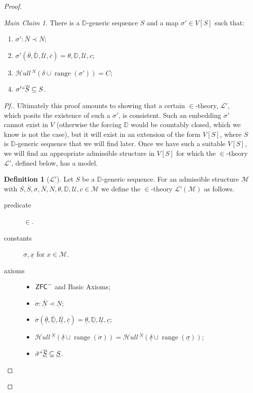 \documentclass{amsart}
\theoremstyle{definition}
\newtheorem{definition}[theorem]{Definition}
\theoremstyle{remark}
\newtheorem*{claim}{Main Claim}
\newcommand{\M}{\mathcal{M}}
\newcommand{\D}{\mathbb{D}}
\newcommand{\N}{{\overline{N}}}
\renewcommand{\S}{{\overline{S}}}
\newcommand{\U}{\mathcal{U}}
\newcommand{\ZFC}{\textup{\ensuremath{\textsf{ZFC}}}}
\DeclareMathOperator{\ran}{range}
\newcommand{\SH}{\mathcal{H}\textit{ull} \,}
\newcommand{\sk}[3]{\SH^{#1}( {#2} \cup {\ran(#3)} ) }
\begin{document}
\begin{proof}
\begin{claim} There is a $\D$-generic sequence $S$ and a map $\sigma' \in V[S]$ such that: \begin{enumerate}
	\item \label{item:mainclaimsigma'elem} $\sigma': \N \prec N$;
	\item \label{item:mainclaim2} $\sigma'(\overline \theta, \overline{\D}, \overline{\U}, \overline c)=\theta, \D, \U, c$;
	\item \label{item:MainClaimC=Sk} $\sk{N}{\delta}{\sigma'} = C$;
	\item \label{item:mainclaimlifts} $\sigma' `` \S \subseteq S$.
\end{enumerate} \end{claim}
\begin{proof}[Pf.]  Ultimately this proof amounts to showing that a certain 
$\in$-theory, $\mathcal L'$, which posits the existence of such a $\sigma'$, is consistent. Such an embedding $\sigma'$ cannot exist in $V$ (otherwise the forcing $\D$ would be countably closed, which we know is not the case), but it will exist in an extension of the form $V[S]$, where $S$ is $\D$-generic sequence that we will find later.
Once we have such a suitable $V[S]$, we will find an appropriate admissible structure in $V[S]$ for which the $\in$-theory $\mathcal L'$, defined below, has a model.

\begin{definition}[$\mathcal L'$] \label{definition:T} Let $S$ be a $\D$-generic sequence. For an admissible structure $\M$ with $S, \overline S, \sigma, \N, N, \theta, \D, \U, c \in \M$ we define the $\in$-theory $\mathcal L'(\M)$ as follows.
\begin{description}
	\item[predicate] $\in$.
	\item[constants] $\dot{\sigma}, \underline x$ for $x \in \M$.
	\item[axioms] \begin{itemize} \item $\ZFC^-$ and \textsf{Basic Axioms};
		\item $\dot \sigma : \overline{\underline N} \prec \underline N$;
		\item $\dot{\sigma}(\overline{\underline{\theta}}, \overline{\underline{\D}}, \overline{\underline{\U}}, \overline{\underline c})=\underline{\theta}, \underline{\D}, \underline{\U}, \underline{c}$;
		\item $\sk{\underline N}{\underline{\delta}}{\dot \sigma} = \sk{\underline N}{\underline \delta}{\underline \sigma}$;
		\item $\dot \sigma ``\overline{\underline S} \subseteq \underline S$.
	\end{itemize}
\end{description}
\end{definition}


\end{proof}
\end{proof}
\end{document}
